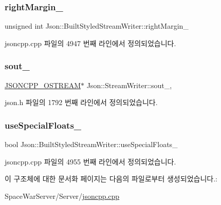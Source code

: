 \subsubsection{\texorpdfstring{right\+Margin\+\_\+}{rightMargin\_}}
{\footnotesize\ttfamily unsigned int Json\+::\+Built\+Styled\+Stream\+Writer\+::right\+Margin\+\_\+\hspace{0.3cm}{\ttfamily [private]}}



jsoncpp.\+cpp 파일의 4947 번째 라인에서 정의되었습니다.

\mbox{\label{class_json_1_1_stream_writer_a4f5603d4228a9fa46a42cb44e5234d9b}} 
\subsubsection{\texorpdfstring{sout\+\_\+}{sout\_}}
{\footnotesize\ttfamily \hyperlink{json_8h_a37a25be5fca174927780caeb280094ce}{J\+S\+O\+N\+C\+P\+P\+\_\+\+O\+S\+T\+R\+E\+AM}$\ast$ Json\+::\+Stream\+Writer\+::sout\+\_\+\hspace{0.3cm}{\ttfamily [protected]}, {\ttfamily [inherited]}}



json.\+h 파일의 1792 번째 라인에서 정의되었습니다.

\mbox{\label{struct_json_1_1_built_styled_stream_writer_a6f1b8694b4eb17ab8c34f6d6dd8c8a4a}} 
\subsubsection{\texorpdfstring{use\+Special\+Floats\+\_\+}{useSpecialFloats\_}}
{\footnotesize\ttfamily bool Json\+::\+Built\+Styled\+Stream\+Writer\+::use\+Special\+Floats\+\_\+\hspace{0.3cm}{\ttfamily [private]}}



jsoncpp.\+cpp 파일의 4955 번째 라인에서 정의되었습니다.



이 구조체에 대한 문서화 페이지는 다음의 파일로부터 생성되었습니다.\+:\begin{DoxyCompactItemize}
\item 
Space\+War\+Server/\+Server/\hyperlink{jsoncpp_8cpp}{jsoncpp.\+cpp}\end{DoxyCompactItemize}
